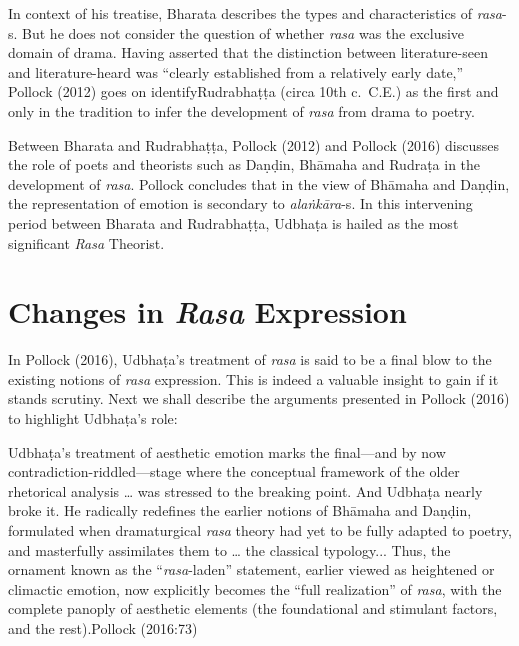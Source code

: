 In context of his treatise, Bharata describes the types and characteristics of \textsl{rasa}-s. But he does not consider the question of whether \textsl{rasa} was the exclusive domain of drama. Having asserted that the distinction between literature-seen and literature-heard was “clearly established from a relatively early date,” Pollock (2012) goes on identify\break Rudrabhaṭṭa (circa 10th c.\ C.E.) as the first and only in the tradition to infer the development of \textsl{rasa} from drama to poetry. 

\newpage

Between Bharata and Rudrabhaṭṭa, Pollock (2012) and Pollock (2016) discusses the role of poets and theorists such as Daṇḍin, Bhāmaha and Rudraṭa in the development of \textsl{rasa}. Pollock concludes that in the view of Bhāmaha and Daṇḍin, the representation of emotion is secondary to \textsl{alaṅkāra}-s. In this intervening period between Bharata and Rudrabhaṭṭa, Udbhaṭa is hailed as the most significant \textsl{Rasa} Theorist. 

\section*{Changes in \textsl{Rasa} Expression}

In Pollock (2016), Udbhaṭa’s treatment of \textsl{rasa} is said to be a final blow to the existing notions of \textsl{rasa} expression. This is indeed a valuable insight to gain if it stands scrutiny. Next we shall describe the arguments presented in Pollock (2016) to highlight Udbhaṭa’s role: 

\begin{myquote}
Udbhaṭa’s treatment of aesthetic emotion marks the final—and by now contradiction-riddled—stage where the conceptual framework of the older rhetorical analysis … was stressed to the breaking point. And Udbhaṭa nearly broke it. He radically redefines the earlier notions of Bhāmaha and Daṇḍin, formulated when dramaturgical \textsl{rasa} theory had yet to be fully adapted to poetry, and masterfully assimilates them to … the classical typology... Thus, the ornament known as the “\textsl{rasa}-laden” statement, earlier viewed as heightened or climactic emotion, now explicitly becomes the “full realization” of \textsl{rasa}, with the complete panoply of aesthetic elements (the foundational and stimulant factors, and the rest).\hfill Pollock (2016:73)
\end{myquote}

